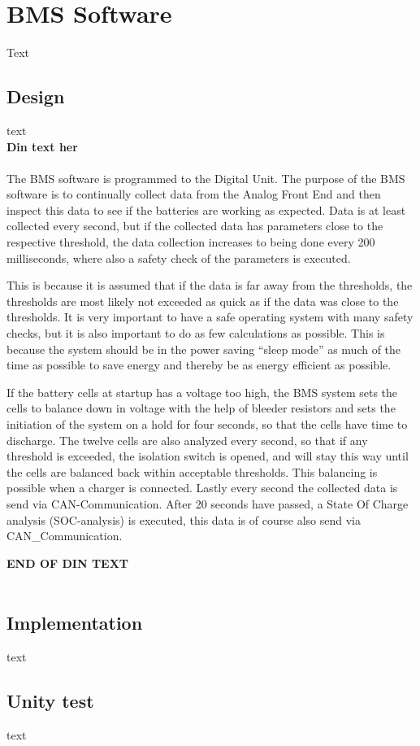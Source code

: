 \section{BMS Software}
Text

\subsection{Design}
text\\

\textbf{Din text her} \\
\\
The BMS software is programmed to the Digital Unit. The purpose of the BMS software is to continually collect data from the Analog Front End and then inspect this data to see if the batteries are working as expected. Data is at least collected every second, but if the collected data has parameters close to the respective threshold, the data collection increases to being done every 200 milliseconds, where also a safety check of the parameters is executed. 

This is because it is assumed that if the data is far away from the thresholds, the thresholds are most likely not exceeded as quick as if the data was close to the thresholds. It is very important to have a safe operating system with many safety checks, but it is also important to do as few calculations as possible. This is because the system should be in the power saving “sleep mode” as much of the time as possible to save energy and thereby be as energy efficient as possible.

If the battery cells at startup has a voltage too high, the BMS system sets the cells to balance down in voltage with the help of bleeder resistors and sets the initiation of the system on a hold for four seconds, so that the cells have time to discharge. The twelve cells are also analyzed every second, so that if any threshold is exceeded, the isolation switch is opened, and will stay this way until the cells are balanced back within acceptable thresholds. This balancing is possible when a charger is connected. Lastly every second the collected data is send via CAN-Communication. After 20 seconds have passed, a State Of Charge analysis (SOC-analysis) is executed, this data is of course also send via CAN\_Communication.

\textbf{END OF DIN TEXT} \\ 
\\


\subsection{Implementation}
text

\subsection{Unity test}
text